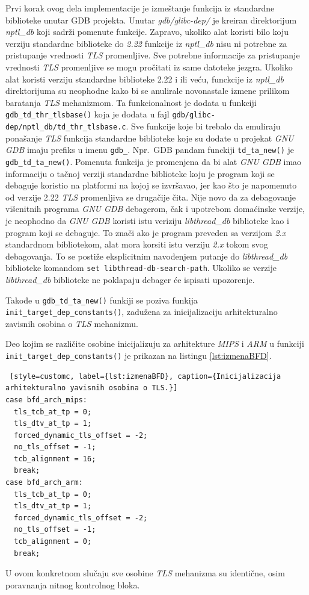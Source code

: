 \documentclass[12pt,oneside]{memoir}
\begin{document}
Prvi korak ovog dela implementacije je izmeštanje funkcija iz standardne biblioteke unutar GDB projekta. Unutar \emph{gdb/glibc-dep/} je kreiran direktorijum \emph{nptl\_db} koji sadrži pomenute funkcije. Zapravo, ukoliko alat koristi bilo koju verziju standardne biblioteke do \emph{2.22} funkcije iz \emph{nptl\_db} nisu ni potrebne za pristupanje vrednosti \emph{TLS} promenljive. Sve potrebne informacije za pristupanje vrednosti \emph{TLS} promenljive se mogu pročitati iz same datoteke jezgra. Ukoliko alat koristi verziju standardne biblioteke 2.22 i ili veću, funckcije iz \emph{nptl\_db} direktorijuma su neophodne kako bi se anulirale novonastale izmene prilikom baratanja \emph{TLS} mehanizmom. Ta funkcionalnost je dodata u funkciji \texttt{gdb\_td\_thr\_tlsbase()} koja je dodata u fajl \texttt{gdb/glibc-dep/nptl\_db/td\_thr\_tlsbase.c}.
Sve funkcije koje bi trebalo da emuliraju ponašanje \emph{TLS} funkcija standardne biblioteke koje su dodate u projekat \emph{GNU GDB} imaju prefiks u imenu \texttt{gdb\_}. Npr.~GDB pandam funckiji \texttt{td\_ta\_new()} je \texttt{gdb\_td\_ta\_new()}. Pomenuta funkcija je promenjena da bi alat \emph{GNU GDB} imao informaciju o tačnoj verziji standardne biblioteke koju je program koji se debaguje koristio na platformi na kojoj se izvršavao, jer kao što je napomenuto od verzije 2.22 \emph{TLS} promenljiva se drugačije čita. Nije novo da za debagovanje višenitnih programa \emph{GNU GDB} debagerom, čak i upotrebom domaćinske verzije, je neophodno da \emph{GNU GDB} koristi istu veriziju \emph{libthread\_db} biblioteke kao i program koji se debaguje. To znači ako je program preveden sa verzijom \emph{2.x} standardnom bibliotekom, alat mora korsiti istu verziju \emph{2.x} tokom svog debagovanja. To se postiže eksplicitnim navođenjem putanje do \emph{libthread\_db} biblioteke komandom \texttt{set libthread-db-search-path}. Ukoliko se verzije \emph{libthread\_db} biblioteke ne poklapaju debager će ispisati upozorenje.

Takođe u \texttt{gdb\_td\_ta\_new()} funkiji se poziva funkija \texttt{init\_target\_dep\_constants()}, zadužena za inicijalizaciju arhitekturalno zavisnih osobina o \emph{TLS} mehanizmu.

Deo kojim se različite osobine inicijalizuju za arhitekture \emph{MIPS} i \emph{ARM} u funkciji \texttt{init\_target\_dep\_constants()} je prikazan na listingu \ref{lst:izmenaBFD}.
\begin{lstlisting} [style=customc, label={lst:izmenaBFD}, caption={Inicijalizacija arhitekturalno yavisnih osobina o TLS.}]
case bfd_arch_mips:
  tls_tcb_at_tp = 0;
  tls_dtv_at_tp = 1;
  forced_dynamic_tls_offset = -2;
  no_tls_offset = -1;
  tcb_alignment = 16;
  break;
case bfd_arch_arm:
  tls_tcb_at_tp = 0;
  tls_dtv_at_tp = 1;
  forced_dynamic_tls_offset = -2;
  no_tls_offset = -1;
  tcb_alignment = 0;
  break;
\end{lstlisting}
U ovom konkretnom slučaju sve osobine \emph{TLS} mehanizma su identične, osim poravnanja nitnog kontrolnog bloka.
\end{document}
